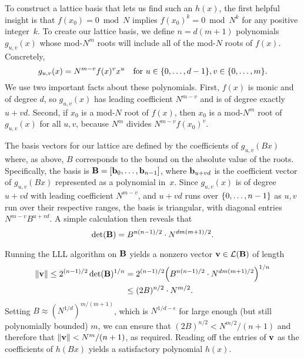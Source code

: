 \documentclass[11pt]{article}
\begin{document}
To construct a lattice basis that lets us find such an $h(x)$, the
first helpful insight is that $f(x_{0}) = 0 \bmod N$ implies
$f(x_{0})^{k} = 0 \bmod N^{k}$ for any positive integer~$k$.  To
create our lattice basis, we define $n=d(m+1)$ polynomials
$g_{u,v}(x)$ whose mod-$N^{m}$ roots will include all of the mod-$N$
roots of $f(x)$.  Concretely,
\[g_{u,v}(x)=N^{m-v} f(x)^{v} x^{u}\quad \text{for } u \in
\{0,\ldots,d-1\}, v \in \{0,\ldots,m\}.\] We use two important
facts about these polynomials. First, $f(x)$ is monic and of degree
$d$, so $g_{u,v}(x)$ has leading coefficient $N^{m-v}$ and is of
degree exactly $u+vd$. Second, if $x_{0}$ is a mod-$N$ root of $f(x)$,
then $x_{0}$ is a mod-$N^{m}$ root of $g_{u,v}(x)$ for all $u,v$,
because $N^{m}$ divides $N^{m-v} f(x_{0})^{v}$.

The basis vectors for our lattice are defined by the coefficients of
$g_{u,v}(Bx)$ where, as above, $B$ corresponds to the bound on the
absolute value of the roots. Specifically, the basis is
$\mathbf{B}=[\mathbf{b}_0,\ldots,\mathbf{b}_{n-1}]$, where $\mathbf{b}_{u+vd}$ is the
coefficient vector of $g_{u,v}(Bx)$ represented as a polynomial
in~$x$.  Since $g_{u,v}(x)$ is of degree $u+vd$ with leading
coefficient $N^{m-v}$, and $u+vd$ runs over $\{0, \ldots, n-1\}$ as
$u,v$ run over their respective ranges, the basis is triangular, with
diagonal entries $N^{m-v} B^{u+vd}$. A simple calculation then reveals
that
\begin{equation}
  \label{eq:det-B}
  \det(\mathbf{B}) = B^{n(n-1)/2} \cdot N^{d m (m+1)/2}.
\end{equation}

Running the LLL algorithm on $\mathbf{B}$ yields a nonzero vector $\mathbf{v}
\in \mathcal{L}(\mathbf{B})$ of length
\begin{align}
  \length{\vecv} \leq 2^{(n-1)/2} \det(\matB)^{1/n} &=
  2^{(n-1)/2} \parens*{B^{n(n-1)/2} \cdot N^{d m(m+1)/2}}^{1/n} \\
  &\leq (2 B)^{n/2} \cdot N^{m/2}.
\end{align}
Setting $B \approx (N^{1/d})^{m/(m+1)}$, which is $N^{1/d-\epsilon}$
for large enough (but still polynomially bounded) $m$, we can ensure
that $(2B)^{n/2} < N^{m/2}/(n+1)$ and therefore that $\lVert\mathbf{v}\rVert <
N^{m}/(n+1)$, as required.  Reading off the entries of $\mathbf{v}$ as
the coefficients of $h(Bx)$ yields a satisfactory polynomial $h(x)$.

\end{document}
